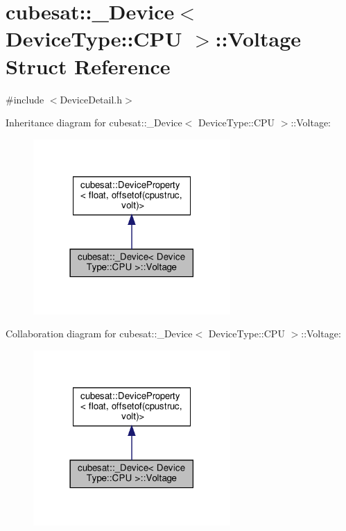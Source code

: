 \hypertarget{structcubesat_1_1__Device_3_01DeviceType_1_1CPU_01_4_1_1Voltage}{}\section{cubesat\+:\+:\+\_\+\+Device$<$ Device\+Type\+:\+:C\+PU $>$\+:\+:Voltage Struct Reference}
\label{structcubesat_1_1__Device_3_01DeviceType_1_1CPU_01_4_1_1Voltage}


{\ttfamily \#include $<$Device\+Detail.\+h$>$}



Inheritance diagram for cubesat\+:\+:\+\_\+\+Device$<$ Device\+Type\+:\+:C\+PU $>$\+:\+:Voltage\+:\nopagebreak
\begin{figure}[H]
\begin{center}
\leavevmode
\includegraphics[width=213pt]{structcubesat_1_1__Device_3_01DeviceType_1_1CPU_01_4_1_1Voltage__inherit__graph}
\end{center}
\end{figure}


Collaboration diagram for cubesat\+:\+:\+\_\+\+Device$<$ Device\+Type\+:\+:C\+PU $>$\+:\+:Voltage\+:\nopagebreak
\begin{figure}[H]
\begin{center}
\leavevmode
\includegraphics[width=213pt]{structcubesat_1_1__Device_3_01DeviceType_1_1CPU_01_4_1_1Voltage__coll__graph}
\end{center}
\end{figure}
